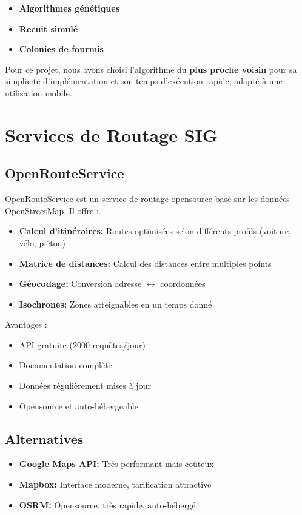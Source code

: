 \documentclass[12pt,a4paper]{report}
\begin{document}
\begin{itemize}
    \item \textbf{Algorithmes génétiques}
    \item \textbf{Recuit simulé}
    \item \textbf{Colonies de fourmis}
\end{itemize}

Pour ce projet, nous avons choisi l'algorithme du \textbf{plus proche voisin} pour sa simplicité d'implémentation et son temps d'exécution rapide, adapté à une utilisation mobile.

\section{Services de Routage SIG}

\subsection{OpenRouteService}

OpenRouteService est un service de routage opensource basé sur les données OpenStreetMap. Il offre :

\begin{itemize}
    \item \textbf{Calcul d'itinéraires:} Routes optimisées selon différents profils (voiture, vélo, piéton)
    \item \textbf{Matrice de distances:} Calcul des distances entre multiples points
    \item \textbf{Géocodage:} Conversion adresse $\leftrightarrow$ coordonnées
    \item \textbf{Isochrones:} Zones atteignables en un temps donné
\end{itemize}

Avantages :
\begin{itemize}
    \item API gratuite (2000 requêtes/jour)
    \item Documentation complète
    \item Données régulièrement mises à jour
    \item Opensource et auto-hébergeable
\end{itemize}

\subsection{Alternatives}

\begin{itemize}
    \item \textbf{Google Maps API:} Très performant mais coûteux
    \item \textbf{Mapbox:} Interface moderne, tarification attractive
    \item \textbf{OSRM:} Opensource, très rapide, auto-hébergé
\end{itemize}
\end{document}
